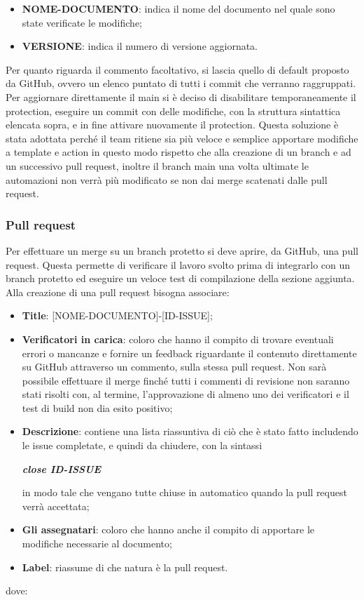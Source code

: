 \begin{itemize}
      \item \textbf{NOME-DOCUMENTO}: indica il nome del documento nel quale sono state verificate le modifiche;
      \item \textbf{VERSIONE}: indica il numero di versione aggiornata.
\end{itemize}
Per quanto riguarda il commento facoltativo, si lascia quello di default proposto da GitHub,
ovvero un elenco puntato di tutti i commit che verranno raggruppati.\\

Per aggiornare direttamente il main si è deciso di disabilitare temporaneamente
il protection, eseguire un commit con delle modifiche, con la struttura
sintattica elencata sopra, e in fine attivare nuovamente il protection. Questa
soluzione è stata adottata perché il team ritiene sia più veloce e semplice
apportare modifiche a template e action in questo modo rispetto che alla
creazione di un branch e ad un successivo pull request, inoltre il branch main
una volta ultimate le automazioni non verrà più modificato se non dai merge
scatenati dalle pull request.

\subsubsection{Pull request}\label{inf:pr}
Per effettuare un merge su un branch protetto si deve aprire, da GitHub, una
pull request. Questa permette di verificare il lavoro svolto prima di
integrarlo con un branch protetto ed eseguire un veloce test di compilazione
della sezione aggiunta. Alla creazione di una pull request bisogna associare:
\begin{itemize}
      \item \textbf{Title}: [NOME-DOCUMENTO]-[ID-ISSUE];
      \item \textbf{Verificatori in carica}: coloro che hanno il compito di trovare eventuali errori o mancanze e fornire un feedback
            riguardante il contenuto direttamente su GitHub attraverso un commento, sulla stessa pull request.
            Non sarà possibile effettuare il merge finché tutti i commenti di revisione non saranno stati risolti
            con, al termine, l'approvazione di almeno uno dei verificatori e il test di build non dia esito positivo;
      \item \textbf{Descrizione}: contiene una lista riassuntiva di ciò che è stato fatto includendo le issue completate, e quindi da chiudere,
            con la sintassi
            \begin{center}
                  \textbf{\textit{close ID-ISSUE}}
            \end{center}
            in modo tale che vengano tutte chiuse in automatico quando la pull request verrà accettata;
      \item \textbf{Gli assegnatari}: coloro che hanno anche il compito di apportare le modifiche necessarie al documento;
      \item \textbf{Label}: riassume di che natura è la pull request.
\end{itemize}
dove:

